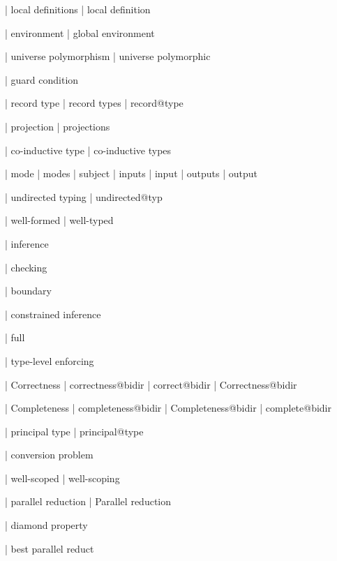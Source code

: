   | local definitions
  | local definition

  | environment
  | global environment

  | universe polymorphism
  | universe polymorphic

  | guard condition

  | record type
  | record types
  | record@type

  | projection
  | projections

  | co-inductive type
  | co-inductive types


  | mode
  | modes
  | subject
  | inputs
  | input
  | outputs
  | output

  | undirected typing
  | undirected@typ


  | well-formed
  | well-typed

  | inference

  | checking

  | boundary

  | constrained inference

  | full

  | type-level enforcing

  | Correctness
  | correctness@bidir
  | correct@bidir
  | Correctness@bidir

  | Completeness
  | completeness@bidir
  | Completeness@bidir
  | complete@bidir


  | principal type
  | principal@type



  | conversion problem

  | well-scoped
  | well-scoping

  | parallel reduction
  | Parallel reduction

  | diamond property

  | best parallel reduct


